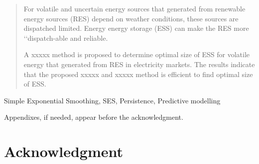 \documentclass{ieeeaccess}
\begin{document}
\begin{abstract}

For volatile and uncertain energy sources that generated from renewable energy sources (RES) depend on weather conditions, these sources are dispatched limited. Energy energy storage (ESS) can make the RES more ‘‘dispatch-able and reliable.



A xxxxx method is proposed to determine optimal size of ESS for volatile energy that generated from RES in electricity markets. The results indicate that the proposed xxxxx and xxxxx method is efficient to find optimal size of ESS. 

\end{abstract}

\begin{keywords}
Simple Exponential Smoothing, SES, Persistence, Predictive modelling
\end{keywords}

\titlepgskip=-15pt

\maketitle



\appendices

Appendixes, if needed, appear before the acknowledgment.

\section*{Acknowledgment}
\end{document}
